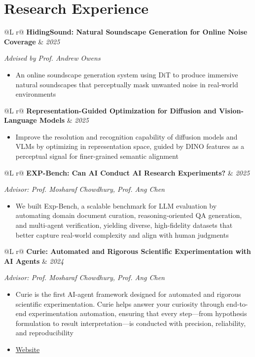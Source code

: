 \documentclass[11pt,a4paper]{article}
\makeatletter
\newcommand{\cventry}[3]{%
  \vspace{4pt}
  \noindent\begin{tabularx}{\linewidth}{@{}L r@{}}
    #1 & \textit{#2}
  \end{tabularx}\par
  #3
  \vspace{4pt}
}
\makeatother
\begin{document}
\section{Research Experience}
\cventry{\textbf{HidingSound: Natural Soundscape Generation for Online Noise Coverage}}{2025}{%
\textit{Advised by Prof. Andrew Owens}\par
\begin{itemize}
\item An online soundscape generation system using DiT to produce immersive natural soundscapes that perceptually mask unwanted noise in real-world environments
\end{itemize}
}
\cventry{\textbf{Representation-Guided Optimization for Diffusion and Vision-Language Models}}{2025}{%
\begin{itemize}
\item Improve the resolution and recognition capability of diffusion models and VLMs by optimizing in representation space, guided by DINO features as a perceptual signal for finer-grained semantic alignment
\end{itemize}
}
\cventry{\textbf{EXP-Bench: Can AI Conduct AI Research Experiments?}}{2025}{%
\textit{Advisor: Prof. Mosharaf Chowdhury, Prof. Ang Chen}\par
\begin{itemize}
\item We built Exp-Bench, a scalable benchmark for LLM evaluation by automating domain document curation, reasoning-oriented QA generation, and multi-agent verification, yielding diverse, high-fidelity datasets that better capture real-world complexity and align with human judgments
\end{itemize}
}
\cventry{\textbf{Curie: Automated and Rigorous Scientific Experimentation with AI Agents}}{2024}{%
\textit{Advisor: Prof. Mosharaf Chowdhury, Prof. Ang Chen}\par
\begin{itemize}
\item Curie is the first AI-agent framework designed for automated and rigorous scientific experimentation. Curie helps answer your curiosity through end-to-end experimentation automation, ensuring that every step—from hypothesis formulation to result interpretation—is conducted with precision, reliability, and reproducibility
\item \href{https://www.just-curieous.com}{Website}
\end{itemize}
}

\end{document}
